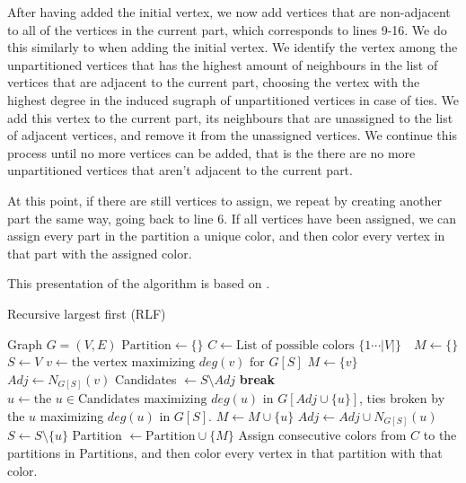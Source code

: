 \documentclass[a4paper]{article}
\newcommand{\algorithmicbreak}{\textbf{break}}
\newcommand{\BREAK}{\STATE \algorithmicbreak}
\begin{document}
After having added the initial vertex, we now add vertices that are
non-adjacent to all of the vertices in the current part,
which corresponds to lines 9-16. We do this similarly
to when adding the initial vertex. We identify the vertex among the
unpartitioned vertices that has the highest amount of neighbours in the list of
vertices that are adjacent to the current part, choosing the vertex with the
highest degree in the induced sugraph of unpartitioned vertices in case of
ties.  We add this vertex to the current part, its neighbours that are
unassigned to the list of adjacent vertices, and remove it from the unassigned
vertices. We continue this process until no more vertices can be added, that is the 
there are no more unpartitioned vertices that aren't adjacent to the current part.

At this point, if there are still vertices to assign, we repeat by creating
another part the same way, going back to line 6. If all vertices have been assigned, we can assign every part in
the partition a unique color, and then color every vertex in that part with the
assigned color.

This presentation of the algorithm is based on \cite{Constructive}.
\begin{algorithm}[H]
  \caption{Recursive largest first (RLF)}
  \label{alg:rlf}
  \begin{algorithmic}[1]
      \REQUIRE Graph $G = (V,E)$
      \STATE $\text{Partition} \leftarrow \{\}$
      \STATE $C \leftarrow \text{List of possible colors $\{1 \cdots |V| \}$ }$
      \STATE $M \leftarrow \{\}$
      \STATE $S \leftarrow V$
        \STATE $v \leftarrow \text{the vertex maximizing $deg(v)$ for $G[S]$} $
        \STATE $M \leftarrow \{v\}$
        \STATE $Adj \leftarrow N_{G[S]}(v)$
            \STATE Candidates $\leftarrow S \setminus Adj$
                \BREAK
            \ENDIF
            \STATE $u \leftarrow \text{the $u \in \text{Candidates}$ maximizing $deg(u)$ in $G[Adj \cup \{u\}]$}$, ties broken by 
            the $u$ maximizing $deg(u)$ in $G[S]$.
            \STATE $M \leftarrow M \cup \{u\}$
            \STATE $Adj \leftarrow Adj \cup N_{G[S]}(u)$
            \STATE $S \leftarrow S \setminus \{u\}$
        \ENDWHILE
        \STATE Partition $\leftarrow \text{Partition} \cup \{M\}$ 
      \ENDWHILE
      \STATE Assign consecutive colors from $C$ to the partitions in Partitions,
      and then color every vertex in that partition with that color.
  \end{algorithmic}
\end{algorithm}
\end{document}
